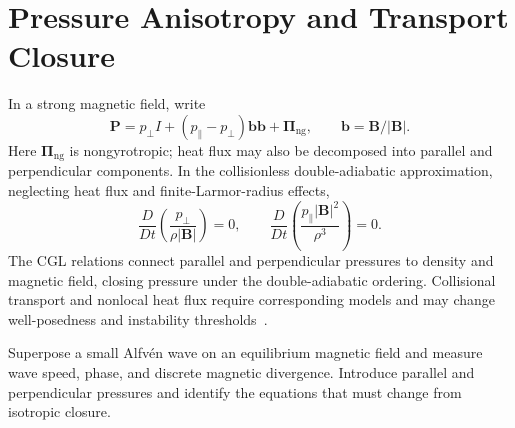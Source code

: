 \section{Pressure Anisotropy and Transport Closure}
In a strong magnetic field, write
\[
\bm P=p_\perp I+(p_\parallel-p_\perp)\bm b\bm b+\bm\Pi_{\mathrm{ng}},
\qquad \bm b=\bm B/|\bm B|.
\]
Here $\bm\Pi_{\mathrm{ng}}$ is nongyrotropic; heat flux may also be decomposed into parallel and perpendicular components.
In the collisionless double-adiabatic approximation, neglecting heat flux and finite-Larmor-radius effects,
\[
\frac{D}{Dt}\left(\frac{p_\perp}{\rho|\bm B|}\right)=0,\qquad
\frac{D}{Dt}\left(\frac{p_\parallel|\bm B|^2}{\rho^3}\right)=0.
\]
The CGL relations connect parallel and perpendicular pressures to density and magnetic field, closing pressure under the double-adiabatic ordering.
Collisional transport and nonlocal heat flux require corresponding models and may change well-posedness and instability thresholds~\cite{cgl1956}.

{Superpose a small Alfv\'en wave on an equilibrium magnetic field and measure wave speed, phase, and discrete magnetic divergence. Introduce parallel and perpendicular pressures and identify the equations that must change from isotropic closure.}
